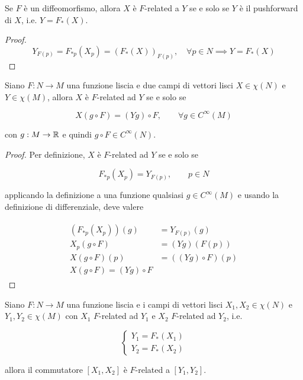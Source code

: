 \begin{remark}
	Se $ F $ è un diffeomorfismo, allora $ X $ è $ F $-related a $ Y $ se e solo se $ Y $ è il pushforward di $ X $, i.e. $ Y = F_{*}(X) $.
\end{remark}

\begin{proof}
	\begin{equation}
		Y_{F(p)} = F_{*p}(X_{p}) = (F_{*}(X))_{F(p)}, \quad \forall p \in N %
		\implies%
		Y = F_{*}(X)
	\end{equation}
\end{proof}

\begin{theorem}
	Siano $ F : N \to M $ una funzione liscia e due campi di vettori lisci $ X \in \chi(N) $ e $ Y \in \chi(M) $, allora $ X $ è $ F $-related ad $ Y $ se e solo se
	
	\begin{equation}
		X(g \circ F) = (Y g) \circ F, \qquad \forall g \in C^{\infty}(M)
	\end{equation}

	con $ g : M \to \mathbb{R} $ e quindi $ g \circ F \in C^{\infty}(N) $.
\end{theorem}

\begin{proof}
	Per definizione, $ X $ è $ F $-related ad $ Y $ se e solo se
	
	\begin{equation}
		F_{*p}(X_{p}) = Y_{F(p)}, \qquad p \in N
	\end{equation}

	applicando la definizione a una funzione qualsiasi $ g \in C^{\infty}(M) $ e usando la definizione di differenziale, deve valere
	
	\begin{align}
		\begin{split}
			(F_{*p}(X_{p}))(g) &= Y_{F(p)}(g)\\
			X_{p}(g \circ F) &= (Y g)(F(p))\\
			X(g \circ F)(p) &= ((Y g) \circ F)(p)\\
			X(g \circ F) = (Y g) \circ F
		\end{split}
	\end{align}
\end{proof}

\begin{theorem}
	Siano $ F : N \to M $ una funzione liscia e i campi di vettori lisci $ X_{1},X_{2} \in \chi(N) $ e $ Y_{1},Y_{2} \in \chi(M) $ con $ X_{1} $ $ F $-related ad $ Y_{1} $ e $ X_{2} $ $ F $-related ad $ Y_{2} $, i.e.
	
	\begin{equation}
		\begin{cases}
			Y_{1} = F_{*}(X_{1})\\
			Y_{2} = F_{*}(X_{2})
		\end{cases}
	\end{equation}

	allora il commutatore $ [X_{1},X_{2}] $ è $ F $-related a $ [Y_{1},Y_{2}] $.
\end{theorem}

